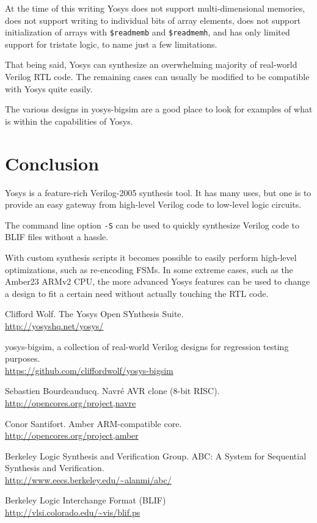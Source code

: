 \documentclass[9pt,technote,a4paper]{IEEEtran}
\begin{document}
At the time of this writing Yosys does not support multi-dimensional memories,
does not support writing to individual bits of array elements, does not
support initialization of arrays with {\tt \$readmemb} and {\tt \$readmemh},
and has only limited support for tristate logic, to name just a few
limitations.

That being said, Yosys can synthesize an overwhelming majority of real-world
Verilog RTL code. The remaining cases can usually be modified to be compatible
with Yosys quite easily.

The various designs in yosys-bigsim are a good place to look for examples
of what is within the capabilities of Yosys.

\section{Conclusion}

Yosys is a feature-rich Verilog-2005 synthesis tool. It has many uses, but
one is to provide an easy gateway from high-level Verilog code to low-level
logic circuits.

The command line option {\tt -S} can be used to quickly synthesize Verilog
code to BLIF files without a hassle.

With custom synthesis scripts it becomes possible to easily perform high-level
optimizations, such as re-encoding FSMs. In some extreme cases, such as the
Amber23 ARMv2 CPU, the more advanced Yosys features can be used to change a
design to fit a certain need without actually touching the RTL code.

\begin{thebibliography}{9}

Clifford Wolf. The Yosys Open SYnthesis Suite. \\
\url{http://yosyshq.net/yosys/}

yosys-bigsim, a collection of real-world Verilog designs for regression testing purposes. \\
\url{https://github.com/cliffordwolf/yosys-bigsim}

Sebastien Bourdeauducq. Navr\'e AVR clone (8-bit RISC). \\
\url{http://opencores.org/project,navre}

Conor Santifort. Amber ARM-compatible core. \\
\url{http://opencores.org/project,amber}

Berkeley Logic Synthesis and Verification Group. ABC: A System for Sequential Synthesis and Verification. \\
\url{http://www.eecs.berkeley.edu/~alanmi/abc/}

Berkeley Logic Interchange Format (BLIF) \\
\url{http://vlsi.colorado.edu/~vis/blif.ps}

\end{thebibliography}
\end{document}

